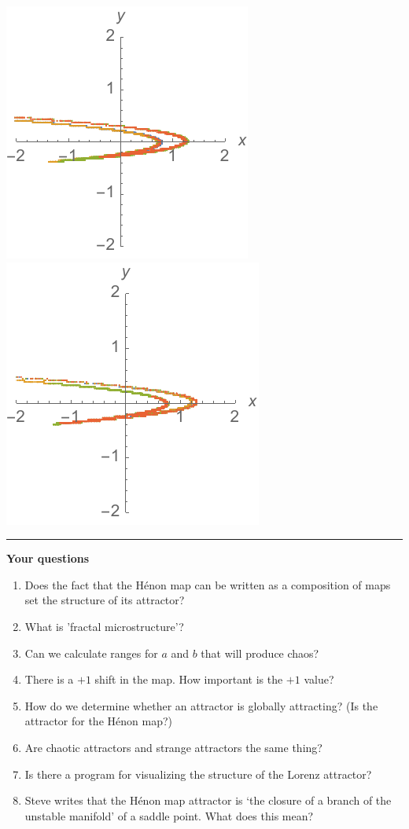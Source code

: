 \documentclass[12pt,letterpaper,noanswers]{exam}
\begin{document}
\includegraphics{img/20191125-p1c.pdf}
\includegraphics{img/20191125-p1d.pdf}

\vspace{0.2cm}
\hrule
\vspace{0.2cm}

\noindent\textbf{Your questions}
\begin{enumerate}
    \item Does the fact that the H\'enon map can be written as a composition of maps set the structure of its attractor?
    \item What is 'fractal microstructure'?
    \item Can we calculate ranges for $a$ and $b$ that will produce chaos?
    \item There is a $+1$ shift in the map.  How important is the $+1$ value?
    \item How do we determine whether an attractor is globally attracting?  (Is the attractor for the H\'enon map?)
    \item Are chaotic attractors and strange attractors the same thing?
    \item Is there a program for visualizing the structure of the Lorenz attractor?
    \item Steve writes that the H\'enon map attractor is `the closure of a branch of the unstable manifold' of a saddle point.  What does this mean?
\end{enumerate}
\end{document}
